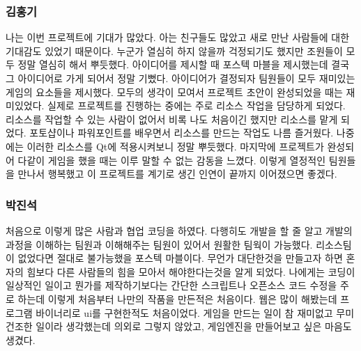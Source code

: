 \documentclass[10pt,oneside,a4paper,titlepage]{article}
\begin{document}
\subsubsection{김홍기}
나는 이번 프로젝트에 기대가 많았다. 아는 친구들도 많았고 새로 만난 사람들에 대한 기대감도 있었기 때문이다. 누군가 열심히 하지 않을까 걱정되기도 했지만 조원들이 모두 정말 열심히 해서 뿌듯했다. 아이디어를 제시할 때 포스텍 마블을 제시했는데 결국 그 아이디어로 가게 되어서 정말 기뻤다. 아이디어가 결정되자 팀원들이 모두 재미있는 게임의 요소들을 제시했다. 모두의 생각이 모여서 프로젝트 초안이 완성되었을 때는 재미있었다. 실제로 프로젝트를 진행하는 중에는 주로 리소스 작업을 담당하게 되었다. 리소스를 작업할 수 있는 사람이 없어서 비록 나도 처음이긴 했지만 리소스를 맡게 되었다. 포토샵이나 파워포인트를 배우면서 리소스를 만드는 작업도 나름 즐거웠다. 나중에는 이러한 리소스를 Qt에 적용시켜보니 정말 뿌듯했다. 마지막에 프로젝트가 완성되어 다같이 게임을 했을 때는 이루 말할 수 없는 감동을 느꼈다. 이렇게 열정적인 팀원들을 만나서 행복했고 이 프로젝트를 계기로 생긴 인연이 끝까지 이어졌으면 좋겠다.

\subsubsection{박진석}

처음으로 이렇게 많은 사람과 협업 코딩을 하였다. 다행히도 개발을 할 줄 알고 개발의 과정을 이해하는 팀원과 이해해주는 팀원이 있어서 원활한 팀웍이 가능했다. 리소스팀이 없었다면 절대로 불가능했을 포스텍 마블이다. 무언가 대단한것을 만들고자 하면 혼자의 힘보다 다른 사람들의 힘을 모아서 해야한다는것을 알게 되었다. 나에게는 코딩이 일상적인 일이고 뭔가를 제작하기보다는 간단한 스크립트나 오픈소스 코드 수정을 주로 하는데 이렇게 처음부터 나만의 작품을 만든적은 처음이다. 웹은 많이 해봤는데 프로그램 바이너리로 ui를 구현한적도 처음이었다. 게임을 만드는 일이 참 재미없고 무미건조한 일이라 생각했는데 의외로 그렇지 않았고, 게임엔진을 만들어보고 싶은 마음도 생겼다. 

	
	
\end{document}
